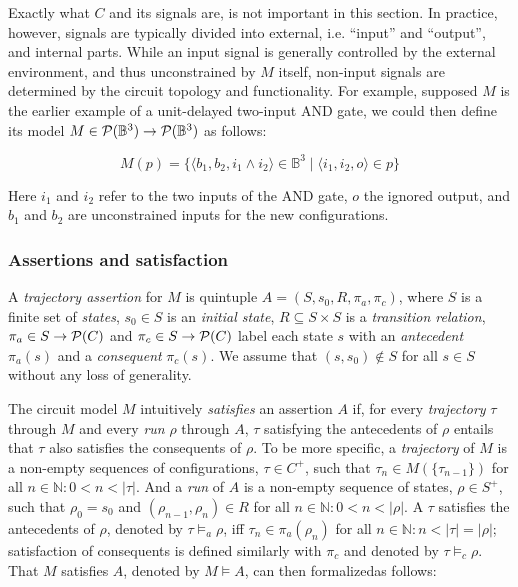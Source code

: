
Exactly what $C$ and its signals are, is not important in this section. In practice, however, signals are typically divided into external, i.e. ``input'' and ``output'', and internal parts. While an input signal is generally controlled by the external environment, and thus unconstrained by $M$ itself, non-input signals are determined by the circuit topology and functionality. For example, supposed $M$ is the earlier example of a unit-delayed two-input AND gate, we could then define its model $M \in \mathcal{P}(\mathbb{B}^{3}) \rightarrow \mathcal{P}(\mathbb{B}^{3})$ as follows:


\begin{equation*}
M(p) = \{ \langle b_{1}, b_{2}, i_{1} \wedge i_{2} \rangle \in \mathbb{B}^{3} \mid \langle i_{1}, i_{2}, o \rangle \in p \}
\end{equation*}

\noindent Here $i_{1}$ and $i_{2}$ refer to the two inputs of the AND gate, $o$ the ignored output, and $b_{1}$ and $b_{2}$ are unconstrained inputs for the new configurations.

\subsubsection{Assertions and satisfaction} \label{sec:set-sat}

A \textit{trajectory assertion} for $M$ is quintuple $A = (S,s_{0},R,\pi_{a},\pi_{c})$, where $S$ is a finite set of \textit{states}, $s_{0} \in S$ is an \textit{initial state}, $R \subseteq S \times S$ is a \textit{transition relation}, $\pi_{a} \in S \rightarrow \mathcal{P}(C)$ and $\pi_{c} \in S \rightarrow \mathcal{P}(C)$ label each state $s$ with an \textit{antecedent} $\pi_{a}(s)$ and a \textit{consequent} $\pi_{c}(s)$. We assume that $(s,s_{0}) \notin S$ for all $s \in S$ without any loss of generality.

The circuit model $M$ intuitively \textit{satisfies} an assertion $A$ if, for every \textit{trajectory} $\tau$ through $M$ and every \textit{run} $\rho$ through $A$, $\tau$ satisfying the antecedents of $\rho$ entails that $\tau$ also satisfies the consequents of $\rho$. To be more specific, a \textit{trajectory} of $M$ is a non-empty sequences of configurations, $\tau \in C^{+}$, such that $\tau_{n} \in M(\{ \tau_{n-1} \})$ for all $n \in \mathbb{N} : 0 < n < | \tau |$. And a \textit{run} of $A$ is a non-empty sequence of states, $\rho \in S^{+}$, such that $\rho_{0} = s_{0}$ and $(\rho_{n-1}, \rho_{n}) \in R$ for all $n \in \mathbb{N} : 0 < n < | \rho |$. A $\tau$ satisfies the antecedents of $\rho$, denoted by $\tau \models_{a} \rho$, iff $\tau_{n} \in \pi_{a}(\rho_{n})$ for all $n \in \mathbb{N} : n < | \tau | = | \rho |$; satisfaction of consequents is defined similarly with $\pi_{c}$ and denoted by $\tau \models_{c} \rho$. That $M$ satisfies $A$, denoted by $M \models A$, can then formalized\footnotemark as follows:

